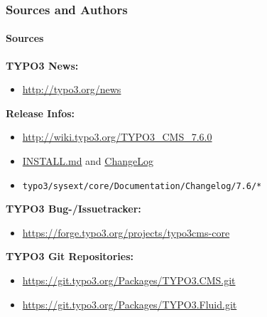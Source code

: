 \begin{frame}[fragile]
	\frametitle{Sources and Authors}
	\framesubtitle{Sources}

	\textbf{TYPO3 News:}
		\begin{itemize}\smaller
			\item \url{http://typo3.org/news}
		\end{itemize}

	\textbf{Release Infos:}
		\begin{itemize}\smaller
			\item \url{http://wiki.typo3.org/TYPO3_CMS_7.6.0}
			\item \href{https://github.com/TYPO3/TYPO3.CMS/blob/master/INSTALL.md}{INSTALL.md} and \href{https://github.com/TYPO3/TYPO3.CMS/blob/master/ChangeLog}{ChangeLog}
			\item \texttt{typo3/sysext/core/Documentation/Changelog/7.6/*}
		\end{itemize}

	\textbf{TYPO3 Bug-/Issuetracker:}
		\begin{itemize}\smaller
			\item \url{https://forge.typo3.org/projects/typo3cms-core}
		\end{itemize}

	\textbf{TYPO3 Git Repositories:}
		\begin{itemize}\smaller
			\item \url{https://git.typo3.org/Packages/TYPO3.CMS.git}
			\item \url{https://git.typo3.org/Packages/TYPO3.Fluid.git}
		\end{itemize}

\end{frame}



